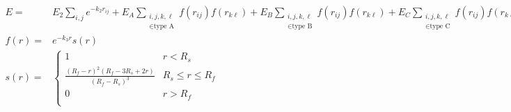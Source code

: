 \documentclass[12pt]{article}
\begin{document}
\begin{align*}
E =& E_2 \sum_{i,j}e^{-k_2 r_{ij}} + E_A \sum_{\substack{i,j,k,\ell \\\in \textrm{type A}}} f(r_{ij})f(r_{k\ell}) + E_B \sum_{\substack{i,j,k,\ell \\\in \textrm{type B}}} f(r_{ij})f(r_{k\ell}) + E_C \sum_{\substack{i,j,k,\ell \\\in \textrm{type C}}} f(r_{ij})f(r_{k\ell}) \\
f(r) =& e^{-k_3 r}s(r) \\
s(r) =& \begin{cases}
  1 & r<R_s \\
  \displaystyle\frac{(R_f-r)^2(R_f-3R_s+2r)}{(R_f-R_s)^3} & R_s\leq r\leq R_f \\
  0 & r>R_f\\
\end{cases}
\end{align*}
\end{document}
